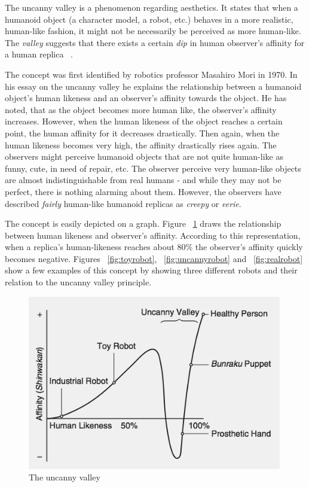 The uncanny valley is a phenomenon regarding aesthetics. It states that when a humanoid object (a character model, a robot, etc.) behaves in a more realistic, human-like fashion, it might not be necessarily be perceived as more human-like. The \textit{valley} suggests that there exists a certain \textit{dip} in human observer's affinity for a human replica ~\cite{uncanny1}.

The concept was first identified by robotics professor Masahiro Mori in 1970. In his essay on the uncanny valley he explains the relationship between a humanoid object's human likeness and an observer's affinity towards the object. He has noted, that as the object becomes more human like, the observer's affinity increases. However, when the human likeness of the object reaches a certain point, the human affinity for it decreases drastically. Then again, when the human likeness becomes very high, the affinity drastically rises again. The observers might perceive humanoid objects that are not quite human-like as funny, cute, in need of repair, etc. The observer perceive very human-like objects are almost indistinguishable from real humans - and while they may not be perfect, there is nothing alarming about them. However, the observers have described \textit{fairly} human-like humanoid replicas as \textit{creepy} or \textit{eerie}.~\cite{uncanny1}~\cite{uncanny2}

The concept is easily depicted on a graph. Figure ~\ref{fig:uncanny} draws the relationship between human likeness and observer's affinity. According to this representation, when a replica's human-likeness reaches about 80\% the observer's affinity quickly becomes negative. Figures ~\ref{fig:toyrobot}, ~\ref{fig:uncannyrobot} and ~\ref{fig:realrobot} show a few examples of this concept by showing three different robots and their relation to the uncanny valley principle. 

\begin{figure}[H]
\centerline{\includegraphics[width = 30em,scale=0.25]{img/uncanny.png}}
\caption{The uncanny valley}\label{fig:uncanny}
\end{figure}

